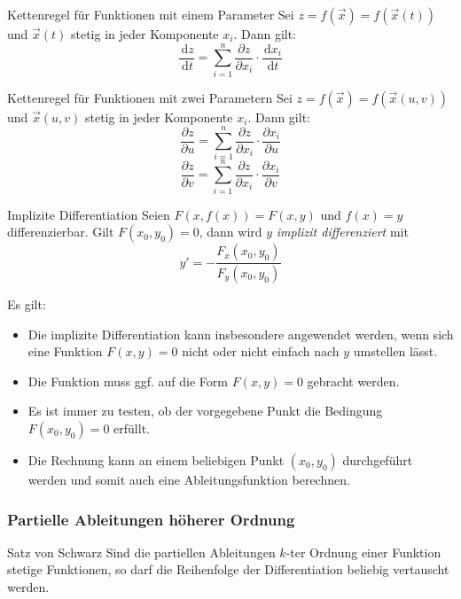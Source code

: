\documentclass[german]{../spicker}
\renewcommand{\d}{\,\mathrm{d}}
\begin{document}
\begin{defi}{Kettenregel für Funktionen mit einem Parameter}
    Sei $z = f(\vec{x}) = f(\vec{x}(t))$ und $\vec{x}(t)$ stetig in jeder Komponente $x_i$. Dann gilt:
    $$
        \frac{\d z}{\d t} = \sum_{i=1}^n \frac{\partial z}{\partial x_i} \cdot \frac{\d x_i}{\d t}
    $$
\end{defi}

\begin{defi}{Kettenregel für Funktionen mit zwei Parametern}
    Sei $z = f(\vec{x}) = f(\vec{x}(u,v))$ und $\vec{x}(u,v)$ stetig in jeder Komponente $x_i$. Dann gilt:
    $$
        \frac{\partial z}{\partial u} = \sum_{i=1}^n \frac{\partial z}{\partial x_i} \cdot \frac{\partial x_i}{\partial u}
    $$
    $$
        \frac{\partial z}{\partial v} = \sum_{i=1}^n \frac{\partial z}{\partial x_i} \cdot \frac{\partial x_i}{\partial v}
    $$
\end{defi}

\begin{defi}{Implizite Differentiation}
    Seien $F(x, f(x)) = F(x, y)$ und $f(x) = y$ differenzierbar.
    Gilt $F(x_0, y_0) = 0$, dann wird $y$ \emph{implizit differenziert} mit
    $$
        y' = -\frac{F_x(x_0, y_0)}{F_y(x_0, y_0)}
    $$

    Es gilt:
    \begin{itemize}
        \item Die implizite Differentiation kann insbesondere angewendet werden, wenn sich eine Funktion $F(x, y)=0$ nicht oder nicht einfach nach $y$ umstellen lässt.
        \item Die Funktion muss ggf. auf die Form $F(x, y) = 0$ gebracht werden.
        \item Es ist immer zu testen, ob der vorgegebene Punkt die Bedingung $F(x_0, y_0) = 0$ erfüllt.
        \item Die Rechnung kann an einem beliebigen Punkt $(x_0, y_0)$ durchgeführt werden und somit auch eine Ableitungsfunktion berechnen.
    \end{itemize}
\end{defi}

\subsubsection{Partielle Ableitungen höherer Ordnung}

\begin{defi}{Satz von Schwarz}
    Sind die partiellen Ableitungen $k$-ter Ordnung einer Funktion stetige Funktionen, so darf die Reihenfolge der Differentiation beliebig vertauscht werden.
\end{defi}
\end{document}
